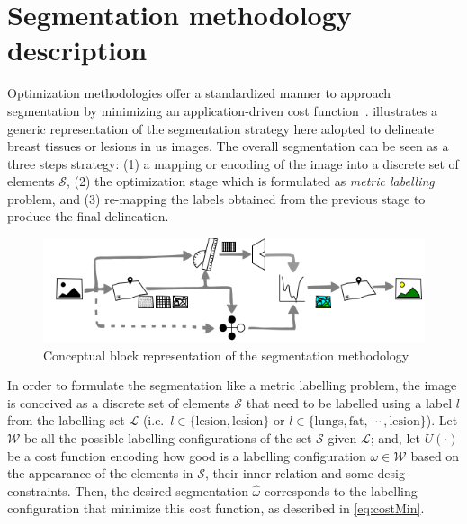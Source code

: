 \graphicspath{ {./content/method/figures/} }

\section{Segmentation methodology description} 

Optimization methodologies offer a standardized manner to approach segmentation by minimizing an application-driven cost function~\cite{cremers2007review}.
 illustrates a generic representation of the segmentation strategy here adopted to delineate breast tissues or lesions in \ac{us} images. 
The overall segmentation can be seen as a three steps strategy: 
(1) a mapping or encoding of the image into a discrete set of elements $\mathcal{S}$, 
(2) the optimization stage which is formulated as \emph{metric labelling} problem, 
and (3) re-mapping the labels obtained from the previous stage to produce the final delineation. 

\begin{figure}[htpb]
  \centering
  \includegraphics[width=0.9\linewidth]{method}
  \caption{Conceptual block representation of the segmentation methodology}
  \label{fig:method}
\end{figure}

In order to formulate the segmentation like a metric labelling problem, the image is conceived as a discrete set of elements $\mathcal{S}$ that need to be labelled using a label $l$ from the labelling set $\mathcal{L}$ 
(i.e.\, $l \in \{\text{lesion}, \overline{\text{lesion}}\}$ 
or $l \in \{\text{lungs}, \text{fat},\,\cdots\,, \text{lesion}\}$).
Let $\mathcal{W}$ be all the possible labelling configurations of the set $\mathcal{S}$ given $\mathcal{L}$; and, let $U(\cdot)$ be a cost function encoding how good is a labelling configuration $\omega \in \mathcal{W}$ based on the appearance of the elements in $\mathcal{S}$, their inner relation and some desig constraints.
Then, the desired segmentation $\hat{\omega}$ corresponds to the labelling configuration that minimize this cost function, as described in \cref{eq:costMin}.

